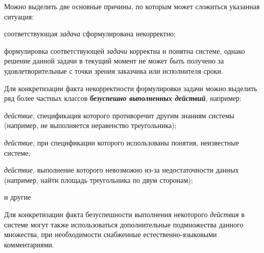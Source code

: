 \begin{SCn}
{Можно выделить две основные причины, по которым может сложиться указанная ситуация:
\begin{scnitemize}
    \item соответствующая \textit{задача} сформулирована некорректно;
    \item формулировка соответствующей \textit{задачи} корректна и понятна системе, однако решение данной задачи в текущий момент не может быть получено за удовлетворительные с точки зрения заказчика или исполнителя сроки.
\end{scnitemize}
Для конкретизации факта некорректности формулировки задачи можно выделить ряд более частных классов \textbf{\textit{безуспешно выполненных действий}}, например:
\begin{scnitemize}
    \item \textit{действие}, спецификация которого противоречит другим знаниям системы (например, не выполняется неравенство треугольника);
    \item \textit{действие}, при спецификации которого использованы понятия, неизвестные системе;
    \item \textit{действие}, выполнение которого невозможно из-за недостаточности данных (например, найти площадь треугольника по двум сторонам);
    \item и другие
\end{scnitemize}
Для конкретизации факта безуспешности выполнения некоторого \textit{действия} в системе могут также использоваться дополнительные подмножества данного множества, при необходимости снабженные естественно-языковыми комментариями.}




\end{SCn}
